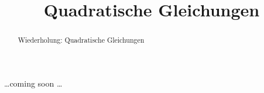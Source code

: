 \documentclass{ximera}
\title{Quadratische Gleichungen}
\begin{document}
\begin{abstract}
Wiederholung: Quadratische Gleichungen
\end{abstract}
\maketitle

\dots coming soon \dots
\end{document}
